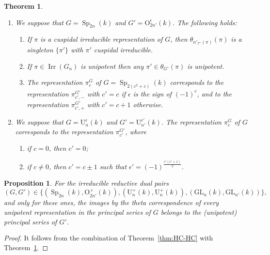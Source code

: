 \documentclass[10pt,a4paper]{amsart}
\newtheorem{thm}{Theorem}
\newtheorem{prop}{Proposition}
\newcommand{\GL}{\mathrm{GL}}
\newcommand{\Irr}{\operatorname{Irr}}
\newcommand{\Sp}{\operatorname{Sp}}
\newcommand{\cT}{\mathcal{T}}
\def\rO{{\mathrm{O}}}
\newcommand{\rU}{\mathrm{U}}
\begin{document}
\begin{thm} \label{thm:ucuspidals} \

\begin{enumerate}
\item We suppose that  $G=\Sp_{2n}(k)$ and $G'=\rO_{2n'}^\epsilon(k)$. The following holds:
\begin{enumerate}
\item If $\pi$ is a cuspidal irreducible  representation of $G$, then $\theta_{n'_{\cT'}(\pi)}(\pi)$ is a singleton $\{\pi'\}$ with $\pi'$ cuspidal irreducible.
\item If $\pi\in\Irr(G_n)$ is unipotent then any $\pi'\in \theta_{G'}(\pi)$ is unipotent.
\item The representation $\pi_c^G$ of $G=\Sp_{2(c^2+c)}(k)$ corresponds to the representation $\pi^{G'}_{c',-}$ with $c'=c$ if $\epsilon$ is the sign of $(-1)^c$, and to the representation $\pi^{G'}_{c',+}$ with $c'=c+1$ otherwise.
\end{enumerate}
\item We suppose that  $G=\rU_{n}^\epsilon(k)$ and $G'=\rU_{n'}^{\epsilon'}(k)$. The representation $\pi_c^G$ of $G$ corresponds to the representation $\pi^{G'}_{c'}$, where
\begin{enumerate}
\item if $c=0$, then $c'=0$;
\item if $c\ne 0$, then $c'=c\pm 1$ such that $\epsilon'=(-1)^{\frac{c'(c'+1)}{2}}$.
\end{enumerate}
\end{enumerate}
\end{thm}

\begin{prop} \label{pro:principal-unipotent}
For the  irreducible reductive dual pairs 
\[(G,G')\in\{(\Sp_{2n}(k),\rO_{2n'}^+(k)),(\rU_{n}^+(k),\rU_{n}^+(k)),(\GL_n(k),\GL_{n'}(k))\},\] 
and only for these ones,  the images by the theta correspondence of every unipotent representation in the principal series of $G$ belongs to the (unipotent) principal series of $G'$.
\end{prop}

\begin{proof}
It follows from the combination of Theorem~\ref{thm:HC-HC} with Theorem~\ref{thm:ucuspidals}.
\end{proof}
\end{document}
